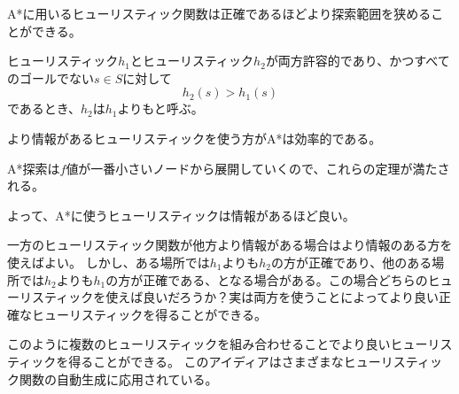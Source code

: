 A*に用いるヒューリスティック関数は正確であるほどより探索範囲を狭めることができる。

 {
  ヒューリスティック$h_1$とヒューリスティック$h_2$が両方許容的であり、かつすべてのゴールでない$s \in S$に対して
  \begin{equation}
    h_2(s) > h_1(s)
  \end{equation}
  であるとき、$h_2$は$h_1$よりもと呼ぶ。
}

より情報があるヒューリスティックを使う方がA*は効率的である。



A*探索は$f$値が一番小さいノードから展開していくので、これらの定理が満たされる。


よって、A*に使うヒューリスティックは情報があるほど良い。


一方のヒューリスティック関数が他方より情報がある場合はより情報のある方を使えばよい。
しかし、ある場所では$h_1$よりも$h_2$の方が正確であり、他のある場所では$h_2$よりも$h_1$の方が正確である、となる場合がある。この場合どちらのヒューリスティックを使えば良いだろうか？実は両方を使うことによってより良い正確なヒューリスティックを得ることができる。


このように複数のヒューリスティックを組み合わせることでより良いヒューリスティックを得ることができる。
このアイディアはさまざまなヒューリスティック関数の自動生成に応用されている。


